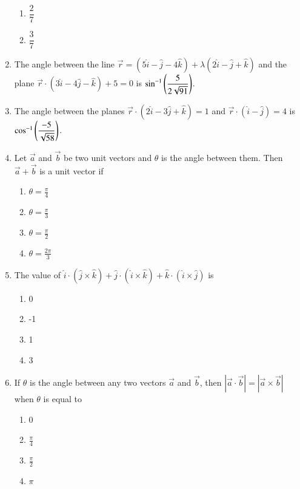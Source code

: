 \begin{enumerate}[label=\thesection.\arabic*,ref=\thesection.\theenumi]
\begin{enumerate}
	\item  $\dfrac{2}{7}$
	\item  $\dfrac{3}{7}$
\end{enumerate}
\item The angle between the line $\overrightarrow{r}=(5\hat{i}-\hat{j}-4\hat{k})+\lambda(2\hat{i}-\hat{j}+\hat{k})$ and the plane $\overrightarrow{r} \cdot (3\hat{i}-4\hat{j}-\hat{k})+5=0$ is $\sin^{-1}\left(\dfrac{5}{2\sqrt{91}}\right)$.
\item The angle between the planes $\overrightarrow{r} \cdot (2\hat{i}-3\hat{j}+\hat{k})=1$ and $\overrightarrow{r} \cdot (\hat{i}-\hat{j})=4$ is $\cos^{-1} \left(\dfrac{-5}{\sqrt{58}}\right)$.
\item Let $\vec{a}$ and $\vec{b}$ be two unit vectors and $\theta$ is the angle between them. Then $\vec{a}+\vec{b}$ is a unit vector if
\begin{enumerate}
\item $\theta=\frac{\pi}{4}$
\item $\theta=\frac{\pi}{3}$
\item $\theta=\frac{\pi}{2}$
\item $\theta=\frac{2\pi}{3}$
\end{enumerate}
\item The value of $\hat{i}\cdot (\hat{j}\times\hat{k})+\hat{j}\cdot (\hat{i}\times\hat{k})+\hat{k}\cdot (\hat{i}\times\hat{j})$ is
\begin{enumerate}
\item 0
\item -1
\item 1
\item 3
\end{enumerate}
\item If $\theta$ is the angle between any two vectors $\vec{a}$ and $\vec{b}$, then $|\vec{a}\cdot \vec{b}|=|\vec{a}\times\vec{b}|$ when $\theta$ is equal to
\begin{enumerate}
\item 0
\item $\frac{\pi}{4}$
\item $\frac{\pi}{2}$
\item $\pi$
\end{enumerate}

\end{enumerate}
